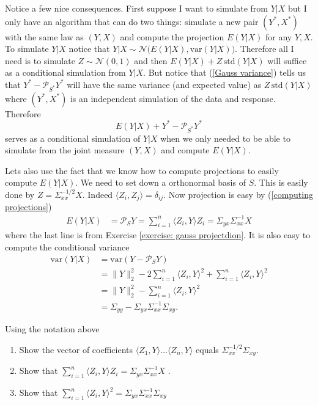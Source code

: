 Notice a few nice consequences. First suppose I want to simulate from $Y|X$ but I only have an algorithm that can do two things: simulate a new pair $(Y^*, X^*)$ with the same law as $(Y,X)$ and compute the projection $E(Y|X)$ for any $Y, X$. To simulate $Y|X$ notice that $Y|X\sim \mathcal N\bigl( E( Y|X), \text{var}(Y|X)\bigr)$. Therefore all I need is to simulate $ Z \sim \mathcal N(0,1)$ and then $E( Y|X) + Z\, \text{std}(Y|X)$ will suffice as a conditional simulation from $Y|X$. But notice that (\ref{Gauss variance}) tells us that $Y^* - \mathcal P_{S^*} Y^*$
 will have the same variance (and expected value) as $Z\, \text{std}(Y|X)$ where $(Y^*, X^*)$ is an independent simulation of the data and response. Therefore
 \[ E(Y|X) + Y^* - \mathcal P_{S^*} Y^*\]
 serves as a conditional simulation of $Y|X$ when we only needed to be able to simulate from the joint measure $(Y, X)$ and compute $E(Y|X)$. 

 Lets also use the fact that we know how to compute projections to easily compute $E(Y|X)$. We need to set down a orthonormal basis of $S$. This is easily done by $Z = \Sigma_{xx}^{-1/2} X$. Indeed $\langle Z_i, Z_j\rangle = \delta_{ij}$. Now projection is easy by (\ref{computing projections})
 \begin{align*} 
 E(Y|X) &= \mathcal P_SY = \sum_{i=1}^n \langle Z_i, Y\rangle Z_i = \Sigma_{yx} \Sigma_{xx}^{-1} X
 \end{align*}
 where the last line is from Exercise \ref{exercise: gauss projectdion}. It is also easy to compute the conditional variance 
\begin{align*}
\text{var}(Y |X) &= \text{var}(Y -\mathcal P_S Y) \\
&= \| Y \|^2_2 - 2\sum_{i=1}^n \langle Z_i, Y\rangle^2 +  \sum_{i=1}^n \langle Z_i, Y\rangle^2 \\
&= \| Y \|^2_2 -  \sum_{i=1}^n \langle Z_i, Y\rangle^2 \\
&= \Sigma_{yy} - \Sigma_{yx} \Sigma_{xx}^{-1} \Sigma_{xy}.
\end{align*}


\begin{exercise}
\label{exercise: gauss projectdion}
Using the notation above
\begin{enumerate}
\item Show the vector of coefficients $\langle Z_1, Y\rangle \ldots \langle Z_n, Y\rangle$ equals $\Sigma_{xx}^{-1/2} \Sigma_{xy}$.
\item Show that  $\sum_{i=1}^n \langle Z_i, Y\rangle Z_i  = \Sigma_{yx} \Sigma_{xx}^{-1} X$ .
\item Show that $\sum_{i=1}^n \langle Z_i, Y\rangle^2 = \Sigma_{yx} \Sigma_{xx}^{-1} \Sigma_{xy}$
\end{enumerate}
\end{exercise}


